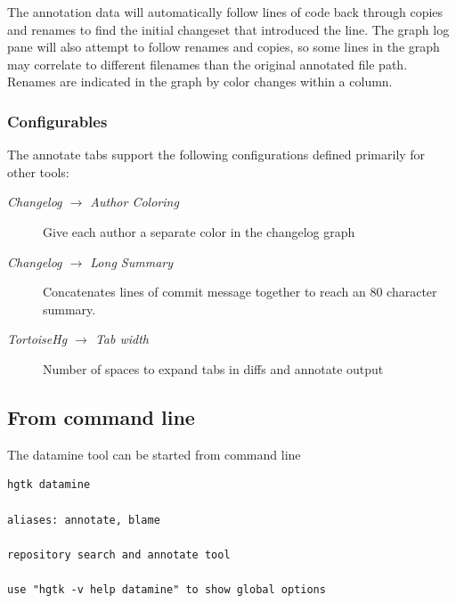 \documentclass[letterpaper,10pt,english]{manual}
\begin{document}
The annotation data will automatically follow lines of code back through
copies and renames to find the initial changeset that introduced the
line.  The graph log pane will also attempt to follow renames and
copies, so some lines in the graph may correlate to different filenames
than the original annotated file path.  Renames are indicated in the
graph by color changes within a column.


\subsubsection{Configurables}

The annotate tabs support the following configurations defined primarily
for other tools:
\begin{description}
\item[\emph{Changelog \(\rightarrow\) Author Coloring}]
Give each author a separate color in the changelog graph

\item[\emph{Changelog \(\rightarrow\) Long Summary}]
Concatenates lines of commit message together to reach an 80
character summary.

\item[\emph{TortoiseHg \(\rightarrow\) Tab width}]
Number of spaces to expand tabs in diffs and annotate output

\end{description}


\subsection{From command line}

The datamine tool can be started from command line

\begin{Verbatim}[commandchars=@\[\]]
hgtk datamine

aliases: annotate, blame

repository search and annotate tool

use "hgtk -v help datamine" to show global options
\end{Verbatim}

\resetcurrentobjects
\hypertarget{--doc-synchronize}{}
\end{document}
